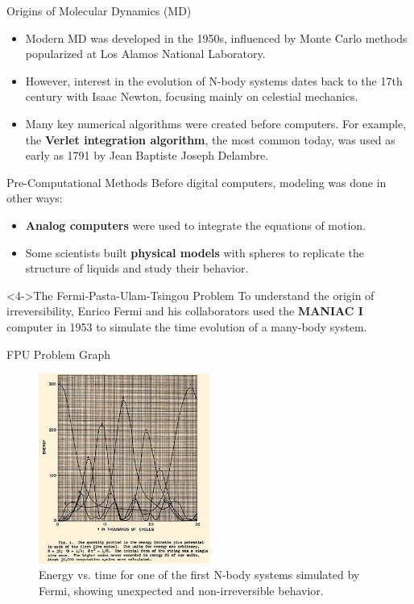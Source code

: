 \begin{frame}{Origins of Molecular Dynamics (MD)}
    \begin{itemize}
        \item Modern MD was developed in the 1950s, influenced by Monte Carlo methods popularized at Los Alamos National Laboratory.
        \pause
        \bigskip
        \item However, interest in the evolution of N-body systems dates back to the 17th century with Isaac Newton, focusing mainly on celestial mechanics.
        \pause
        \bigskip
        \item Many key numerical algorithms were created before computers. For example, the \textbf{Verlet integration algorithm}, the most common today, was used as early as 1791 by Jean Baptiste Joseph Delambre.
    \end{itemize}
\end{frame}

\begin{frame}{Pre-Computational Methods}
    Before digital computers, modeling was done in other ways:
    \pause
    
    \begin{itemize}
        \item \textbf{Analog computers} were used to integrate the equations of motion.
        \pause
        \item Some scientists built \textbf{physical models} with spheres to replicate the structure of liquids and study their behavior.
    \end{itemize}
    \pause
    
    \begin{block}<4->{The Fermi-Pasta-Ulam-Tsingou Problem}
        To understand the origin of irreversibility, Enrico Fermi and his collaborators used the \textbf{MANIAC I} computer in 1953 to simulate the time evolution of a many-body system.
    \end{block}
\end{frame}

\begin{frame}{FPU Problem Graph}
    \begin{figure}
        \includegraphics[width=0.5\textwidth]{images/MANIAC.png}
        \caption{Energy vs. time for one of the first N-body systems simulated by Fermi, showing unexpected and non-irreversible behavior.}
    \end{figure}
\end{frame}

